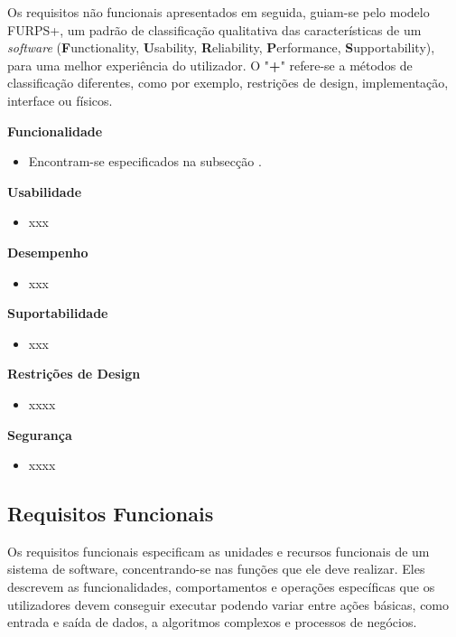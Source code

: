 Os requisitos não funcionais apresentados em seguida, guiam-se pelo modelo FURPS+, um padrão de 
classificação qualitativa das características de um \textit{software}
(\textbf{F}unctionality, \textbf{U}sability, \textbf{R}eliability, \textbf{P}erformance, \textbf{S}upportability), 
para uma melhor experiência do utilizador. O "\textbf{+}" refere-se a métodos de classificação 
diferentes, como por exemplo, restrições de design, implementação, interface ou físicos.

\vspace{5mm}

\textbf{Funcionalidade}
\begin{itemize}
  \item Encontram-se especificados na subsecção .
\end{itemize}

\textbf{Usabilidade}
\begin{itemize}
  \item xxx
\end{itemize}

\textbf{Desempenho}
\begin{itemize}
  \item xxx
\end{itemize}

\textbf{Suportabilidade}
\begin{itemize}
  \item xxx
\end{itemize}

\textbf{Restrições de Design}
\begin{itemize}
  \item xxxx
\end{itemize}

\textbf{Segurança}
\begin{itemize}
  \item xxxx
\end{itemize}

\subsection{Requisitos Funcionais}
\label{sec:3-rf}

Os requisitos funcionais especificam as unidades e recursos funcionais de um sistema de software, 
concentrando-se nas funções que ele deve realizar. Eles descrevem as funcionalidades, comportamentos
e operações específicas que os utilizadores devem conseguir executar podendo variar entre ações básicas, 
como entrada e saída de dados, a algoritmos complexos e processos de negócios.

